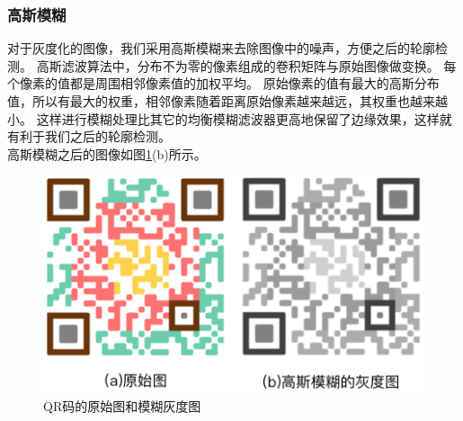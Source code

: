 \subsubsection{高斯模糊}
对于灰度化的图像，我们采用高斯模糊来去除图像中的噪声，方便之后的轮廓检测。
高斯滤波算法中，分布不为零的像素组成的卷积矩阵与原始图像做变换。
每个像素的值都是周围相邻像素值的加权平均。
原始像素的值有最大的高斯分布值，所以有最大的权重，相邻像素随着距离原始像素越来越远，其权重也越来越小。
这样进行模糊处理比其它的均衡模糊滤波器更高地保留了边缘效果，这样就有利于我们之后的轮廓检测。\\
高斯模糊之后的图像如图\ref{fig:blured}(b)所示。
\begin{figure}[h]
\centering
\includegraphics[width=0.9\linewidth]{blured}
\caption[blured]{QR码的原始图和模糊灰度图}
\label{fig:blured}
\end{figure}

